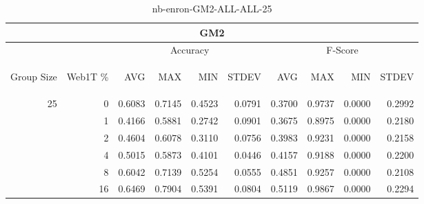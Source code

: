 \begin{center}
\begin{table}[htbp] 
 \begin{center}
\begin{tabular}{ | r | r | r | r | r | r | r | r | r | r |}
\hline
\multicolumn{10}{|c|}{GM2}\\
\hline
 & & \multicolumn{4}{|c|}{Accuracy} & \multicolumn{4}{|c|}{F-Score}\\ \cline{3-10}
\begin{sideways}Group Size\end{sideways} & \begin{sideways}Web1T \%\end{sideways} & \begin{sideways}AVG\end{sideways} & \begin{sideways}MAX\end{sideways} & \begin{sideways}MIN\end{sideways} & \begin{sideways}STDEV\end{sideways} & \begin{sideways}AVG\end{sideways} & \begin{sideways}MAX\end{sideways} & \begin{sideways}MIN\end{sideways} & \begin{sideways}STDEV\end{sideways}\\
\hline
\multirow{5}{*}{25}
 & 0 & 0.6083 & 0.7145 & 0.4523 & 0.0791 & 0.3700 & 0.9737 & 0.0000 & 0.2992\\ \cline{2-10}
 & 1 & 0.4166 & 0.5881 & 0.2742 & 0.0901 & 0.3675 & 0.8975 & 0.0000 & 0.2180\\ \cline{2-10}
 & 2 & 0.4604 & 0.6078 & 0.3110 & 0.0756 & 0.3983 & 0.9231 & 0.0000 & 0.2158\\ \cline{2-10}
 & 4 & 0.5015 & 0.5873 & 0.4101 & 0.0446 & 0.4157 & 0.9188 & 0.0000 & 0.2200\\ \cline{2-10}
 & 8 & 0.6042 & 0.7139 & 0.5254 & 0.0555 & 0.4851 & 0.9257 & 0.0000 & 0.2108\\ \cline{2-10}
 & 16 & 0.6469 & 0.7904 & 0.5391 & 0.0804 & 0.5119 & 0.9867 & 0.0000 & 0.2294\\ \cline{2-10}
\hline
\end{tabular}
\caption{nb-enron-GM2-ALL-ALL-25}
\label{table:nb-enron-GM2-ALL-ALL-25}
\end{center}
 \end{table}
\end{center}


